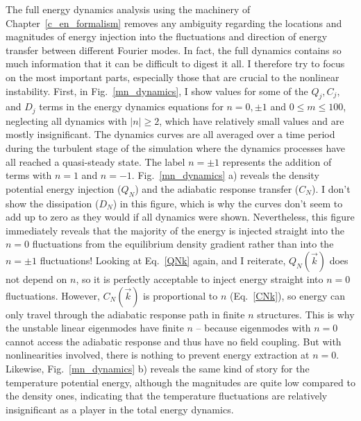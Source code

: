 The full energy dynamics analysis using the machinery of Chapter~\ref{c_en_formalism} removes any ambiguity regarding the locations and magnitudes of energy injection into the fluctuations
and direction of energy transfer between different Fourier modes. In fact, the full dynamics contains so much information that it can be difficult to digest it all. I therefore try to
focus on the most important parts, especially those that are crucial to the nonlinear instability. First, in Fig.~\ref{mn_dynamics}, I show values for some of the $Q_j, C_j,$ and $D_j$
terms in the energy dynamics equations for $n=0, \pm 1$ and $0 \le m \le 100$,
neglecting all dynamics with $|n| \ge 2$, which have relatively small values and are mostly insignificant. The dynamics curves are all averaged over a time period during the
turbulent stage of the simulation where the dynamics processes have all reached a quasi-steady state.
The label $n = \pm 1$ represents the addition of terms with $n=1$ and $n=-1$.
Fig.~\ref{mn_dynamics} a) reveals the density potential energy injection ($Q_N$) and the adiabatic response transfer ($C_N$). I don't show the dissipation ($D_N$) in this figure, which
is why the curves don't seem to add up to zero as they would if all dynamics were shown.
Nevertheless, this figure immediately reveals that the majority of the energy is injected
straight into the $n=0$ fluctuations from the equilibrium density gradient rather than into the $n= \pm 1$ fluctuations! Looking at Eq.~\ref{QNk} again, and I reiterate, $Q_N(\vec{k})$ does not
depend on $n$, so it is perfectly acceptable to inject energy straight into $n=0$ fluctuations. However, $C_N(\vec{k})$ is proportional to $n$ (Eq.~\ref{CNk}), so energy can only travel
through the adiabatic response path in finite $n$ structures. This is why the unstable linear eigenmodes have finite $n$ -- because eigenmodes with $n=0$ cannot access the adiabatic response and thus
have no field coupling. But with nonlinearities involved, there is nothing to prevent energy extraction at $n=0$.
Likewise, Fig.~\ref{mn_dynamics} b) reveals the same kind of story for the temperature potential energy, although the magnitudes are quite low compared to the density ones,
indicating that the temperature fluctuations are relatively insignificant as a player in the total energy dynamics.

